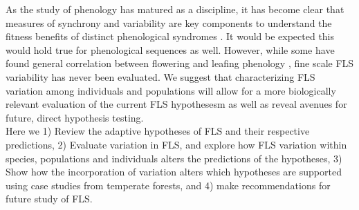 \documentclass[12pt]{article}\usepackage[]{graphicx}\usepackage[]{color}
\begin{document}
\indent As the study of phenology has matured as a discipline, it has become clear that measures of synchrony and variability are key components to understand the fitness benefits of distinct phenological syndromes \citep{OLLERTON_1992}. It would be expected this would hold true for phenological sequences as well. However, while some have found general correlation between flowering and leafing phenology \citep{Lechowicz_1995, Ettinger2018}, fine scale FLS variability has never been evaluated. We suggest that characterizing FLS variation among individuals and populations will allow for a more biologically relevant evaluation of the current FLS hypothesesm as well as reveal avenues for future, direct hypothesis testing.\\
\indent Here we 1) Review the adaptive hypotheses of FLS and their respective predictions, 2) Evaluate variation in FLS, and explore how FLS variation within species, populations and individuals alters the predictions of the hypotheses, 3) Show how the incorporation of variation alters which hypotheses are supported using case studies from temperate forests, and 4) make recommendations for future study of FLS. 
\end{document}
